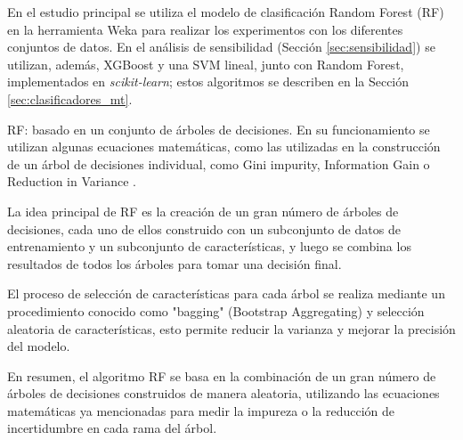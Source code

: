 En el estudio principal se utiliza el modelo de clasificación Random Forest (RF) en la herramienta Weka para realizar los experimentos con los diferentes conjuntos de datos. En el análisis de sensibilidad (Sección \ref{sec:sensibilidad}) se utilizan, además, XGBoost y una SVM lineal, junto con Random Forest, implementados en \textit{scikit-learn}; estos algoritmos se describen en la Sección \ref{sec:clasificadores_mt}.

RF: basado en un conjunto de árboles de decisiones. En su funcionamiento se utilizan algunas ecuaciones matemáticas, como las utilizadas en la construcción de un árbol de decisiones individual, como Gini impurity, Information Gain o Reduction in Variance \cite{shah_comparative_2020}.

La idea principal de RF es la creación de un gran número de árboles de decisiones, cada uno de ellos construido con un subconjunto de datos de entrenamiento y un subconjunto de características, y luego se combina los resultados de todos los árboles para tomar una decisión final.

El proceso de selección de características para cada árbol se realiza mediante un procedimiento conocido como "bagging" (Bootstrap Aggregating) y selección aleatoria de características, esto permite reducir la varianza y mejorar la precisión del modelo.

En resumen, el algoritmo RF se basa en la combinación de un gran número de árboles de decisiones construidos de manera aleatoria, utilizando las ecuaciones matemáticas ya mencionadas para medir la impureza o la reducción de incertidumbre en cada rama del árbol.


